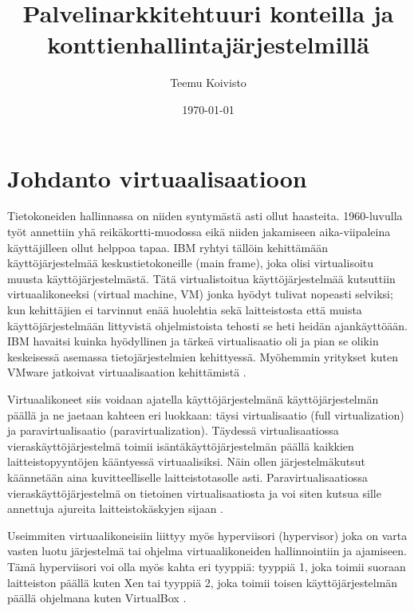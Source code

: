 \documentclass[finnish]{tktltiki2}
\title{Palvelinarkkitehtuuri konteilla ja konttienhallintajärjestelmillä}
\author{Teemu Koivisto}
\date{\today}
\theoremstyle{definition}
\theoremstyle{remark}
\begin{document}

\frontmatter      %

\maketitle        %
\makeabstract     %

\tableofcontents  %


\mainmatter       %

\section{Johdanto virtuaalisaatioon}

Tietokoneiden hallinnassa on niiden syntymästä asti ollut haasteita. 1960-luvulla työt annettiin yhä reikäkortti-muodossa eikä niiden jakamiseen aika-viipaleina käyttäjilleen ollut helppoa tapaa. IBM ryhtyi tällöin kehittämään käyttöjärjestelmää keskustietokoneille (main frame), joka olisi virtualisoitu muusta käyttöjärjestelmästä. Tätä virtualistoitua käyttöjärjestelmää kutsuttiin virtuaalikoneeksi (virtual machine, VM) jonka hyödyt tulivat nopeasti selviksi; kun kehittäjien ei tarvinnut enää huolehtia sekä laitteistosta että muista käyttöjärjestelmään littyvistä ohjelmistoista tehosti se heti heidän ajankäyttöään. IBM havaitsi kuinka hyödyllinen ja tärkeä virtualisaatio oli ja pian se olikin keskeisessä asemassa tietojärjestelmien kehittyessä. Myöhemmin yritykset kuten VMware jatkoivat virtuaalisaation kehittämistä \cite{ibm-looks-to-future}.

Virtuaalikoneet siis voidaan ajatella käyttöjärjestelmänä käyttöjärjestelmän päällä ja ne jaetaan kahteen eri luokkaan: täysi virtualisaatio (full virtualization) ja paravirtualisaatio (paravirtualization). Täydessä virtualisaatiossa vieraskäyttöjärjestelmä toimii isäntäkäyttöjärjestelmän päällä kaikkien laitteistopyyntöjen kääntyessä virtuaalisiksi. Näin ollen järjestelmäkutsut käännetään aina kuvitteelliselle laitteistotasolle asti. Paravirtualisaatiossa vieraskäyttöjärjestelmä on tietoinen virtualisaatiosta ja voi siten kutsua sille annettuja ajureita laitteistokäskyjen sijaan \cite{xen-paravirtualization}.

Useimmiten virtuaalikoneisiin liittyy myös hyperviisori (hypervisor) joka on varta vasten luotu järjestelmä tai ohjelma virtuaalikoneiden hallinnointiin ja ajamiseen. Tämä hyperviisori voi olla myös kahta eri tyyppiä: tyyppiä 1, joka toimii suoraan laitteiston päällä kuten Xen tai tyyppiä 2, joka toimii toisen käyttöjärjestelmän päällä ohjelmana kuten VirtualBox \cite{hypervisor}.
\end{document}
